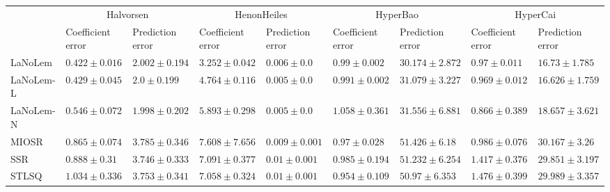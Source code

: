 \begin{table*}
{\begin{tabular}{lllllllll}
 & \multicolumn{2}{c}{Halvorsen} & \multicolumn{2}{c}{HenonHeiles} & \multicolumn{2}{c}{HyperBao} & \multicolumn{2}{c}{HyperCai} \\
 & Coefficient error & Prediction error & Coefficient error & Prediction error & Coefficient error & Prediction error & Coefficient error & Prediction error \\
\midrule
LaNoLem & $\mathbf{0.422}\pm 0.016$ & $2.002\pm 0.194$ & $\mathbf{3.252}\pm 0.042$ & $0.006\pm 0.0$ & $0.99\pm 0.002$ & $\mathbf{30.174}\pm 2.872$ & $0.97\pm 0.011$ & $16.73\pm 1.785$ \\
LaNoLem-L & $0.429\pm 0.045$ & $2.0\pm 0.199$ & $4.764\pm 0.116$ & $\mathbf{0.005}\pm 0.0$ & $0.991\pm 0.002$ & $31.079\pm 3.227$ & $0.969\pm 0.012$ & $\mathbf{16.626}\pm 1.759$ \\
LaNoLem-N & $0.546\pm 0.072$ & $\mathbf{1.998}\pm 0.202$ & $5.893\pm 0.298$ & $0.005\pm 0.0$ & $1.058\pm 0.361$ & $31.556\pm 6.881$ & $\mathbf{0.866}\pm 0.389$ & $18.657\pm 3.621$ \\
MIOSR & $0.865\pm 0.074$ & $3.785\pm 0.346$ & $7.608\pm 7.656$ & $0.009\pm 0.001$ & $0.97\pm 0.028$ & $51.426\pm 6.18$ & $0.986\pm 0.076$ & $30.167\pm 3.26$ \\
SSR & $0.888\pm 0.31$ & $3.746\pm 0.333$ & $7.091\pm 0.377$ & $0.01\pm 0.001$ & $0.985\pm 0.194$ & $51.232\pm 6.254$ & $1.417\pm 0.376$ & $29.851\pm 3.197$ \\
STLSQ & $1.034\pm 0.336$ & $3.753\pm 0.341$ & $7.058\pm 0.324$ & $0.01\pm 0.001$ & $\mathbf{0.954}\pm 0.109$ & $50.97\pm 6.353$ & $1.476\pm 0.399$ & $29.989\pm 3.357$ \\

\midrule


\end{tabular}}
\end{table*}
